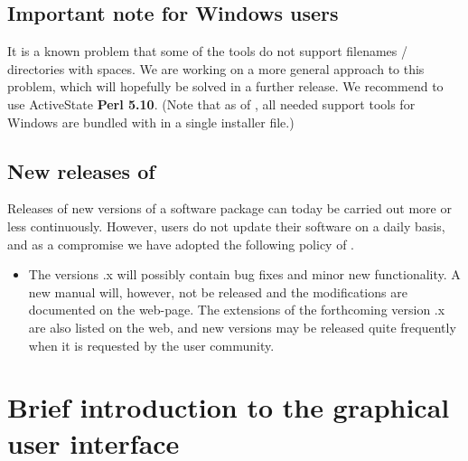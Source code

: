 \subsection{Important note for Windows users} 
It is a known problem that some of
the \MCS tools do not support filenames / directories with spaces.
We are working on a more general approach to this problem, which will
hopefully be solved in a further release. We recommend to use
ActiveState \textbf{Perl 5.10}. (Note that as of , all needed
support tools for Windows are bundled with \MCS in a single installer file.)

\subsection{New releases of \MCS}

Releases of new versions of a software package can today be carried out more or
less continuously. However, users do not update their software on a daily basis,
and as a compromise we have adopted the following policy of \MCS .

\begin{itemize}
\item The versions {\version}.x will possibly contain bug fixes and minor new
  functionality. A new manual will, however, not be released and the
  modifications are documented on the \MCS web-page. The extensions of the
  forthcoming version {\version}.x are also listed on the web, and new versions
  may be released quite frequently when it is requested by the user community.
\end{itemize}


\section{Brief introduction to the graphical user interface}
\label{s:brief}


